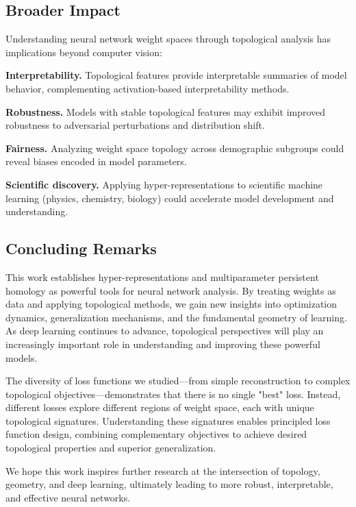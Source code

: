 \subsection{Broader Impact}

Understanding neural network weight spaces through topological analysis has implications beyond computer vision:

\textbf{Interpretability.} Topological features provide interpretable summaries of model behavior, complementing activation-based interpretability methods.

\textbf{Robustness.} Models with stable topological features may exhibit improved robustness to adversarial perturbations and distribution shift.

\textbf{Fairness.} Analyzing weight space topology across demographic subgroups could reveal biases encoded in model parameters.

\textbf{Scientific discovery.} Applying hyper-representations to scientific machine learning (physics, chemistry, biology) could accelerate model development and understanding.

\subsection{Concluding Remarks}

This work establishes hyper-representations and multiparameter persistent homology as powerful tools for neural network analysis. By treating weights as data and applying topological methods, we gain new insights into optimization dynamics, generalization mechanisms, and the fundamental geometry of learning. As deep learning continues to advance, topological perspectives will play an increasingly important role in understanding and improving these powerful models.

The diversity of loss functions we studied—from simple reconstruction to complex topological objectives—demonstrates that there is no single "best" loss. Instead, different losses explore different regions of weight space, each with unique topological signatures. Understanding these signatures enables principled loss function design, combining complementary objectives to achieve desired topological properties and superior generalization.

We hope this work inspires further research at the intersection of topology, geometry, and deep learning, ultimately leading to more robust, interpretable, and effective neural networks.
